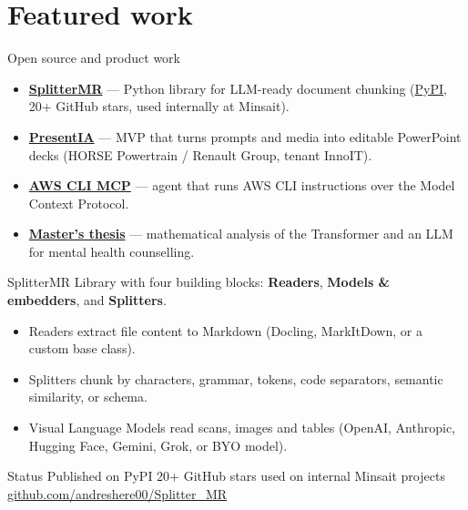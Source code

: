 \documentclass[10pt]{beamer}
\begin{document}
\section{Featured work}

\begin{frame}{Open source and product work}
  \begin{itemize}
    \item \href{https://github.com/andreshere00/Splitter_MR}{\textbf{SplitterMR}}
          --- Python library for LLM-ready document chunking
          (\href{https://pypi.org/project/splitter-mr/}{PyPI}, 20+ GitHub stars,
          used internally at Minsait).
    \item \href{https://github.com/andreshere00/PPTX-Generator}{\textbf{PresentIA}}
          --- MVP that turns prompts and media into editable PowerPoint decks
          (HORSE Powertrain / Renault Group, tenant InnoIT).
    \item \href{https://github.com/andreshere00/aws_cli_mcp}{\textbf{AWS CLI MCP}}
          --- agent that runs AWS CLI instructions over the Model Context
          Protocol.
    \item \href{https://github.com/andreshere00/TFM-LLM}{\textbf{Master's thesis}}
          --- mathematical analysis of the Transformer and an LLM for mental
          health counselling.
  \end{itemize}
\end{frame}

\begin{frame}{SplitterMR}
  Library with four building blocks: \textbf{Readers}, \textbf{Models \&
  embedders}, and \textbf{Splitters}.

  \begin{itemize}
    \item Readers extract file content to Markdown (Docling, MarkItDown, or a
          custom base class).
    \item Splitters chunk by characters, grammar, tokens, code separators,
          semantic similarity, or schema.
    \item Visual Language Models read scans, images and tables
          (OpenAI, Anthropic, Hugging Face, Gemini, Grok, or BYO model).
  \end{itemize}

  \begin{exampleblock}{Status}
    Published on PyPI \textbullet{} 20+ GitHub stars \textbullet{} used on
    internal Minsait projects\\
    \href{https://github.com/andreshere00/Splitter_MR}{github.com/andreshere00/Splitter\_MR}
  \end{exampleblock}
\end{frame}
\end{document}
